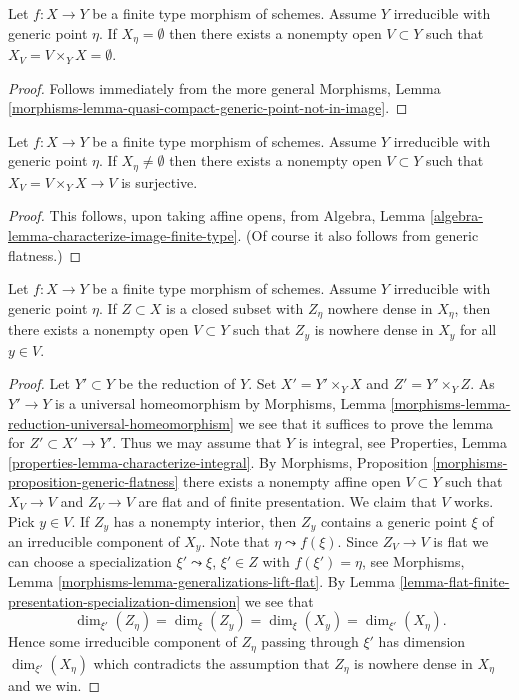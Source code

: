 \begin{lemma}
\label{lemma-empty-generic-fibre}
Let $f : X \to Y$ be a finite type morphism of schemes. Assume
$Y$ irreducible with generic point $\eta$. If $X_\eta = \emptyset$
then there exists a nonempty open $V \subset Y$ such that
$X_V = V \times_Y X = \emptyset$.
\end{lemma}

\begin{proof}
Follows immediately from the more general
Morphisms,
Lemma \ref{morphisms-lemma-quasi-compact-generic-point-not-in-image}.
\end{proof}

\begin{lemma}
\label{lemma-nonempty-generic-fibre}
Let $f : X \to Y$ be a finite type morphism of schemes. Assume
$Y$ irreducible with generic point $\eta$. If $X_\eta \not = \emptyset$
then there exists a nonempty open $V \subset Y$ such that
$X_V = V \times_Y X \to V$ is surjective.
\end{lemma}

\begin{proof}
This follows, upon taking affine opens, from
Algebra, Lemma \ref{algebra-lemma-characterize-image-finite-type}.
(Of course it also follows from generic flatness.)
\end{proof}

\begin{lemma}
\label{lemma-nowhere-dense-generic-fibre}
Let $f : X \to Y$ be a finite type morphism of schemes. Assume
$Y$ irreducible with generic point $\eta$.
If $Z \subset X$ is a closed subset with $Z_\eta$ nowhere dense
in $X_\eta$, then there exists a nonempty open $V \subset Y$ such
that $Z_y$ is nowhere dense in $X_y$ for all $y \in V$.
\end{lemma}

\begin{proof}
Let $Y' \subset Y$ be the reduction of $Y$.
Set $X' = Y' \times_Y X$ and $Z' = Y' \times_Y Z$.
As $Y' \to Y$ is a universal homeomorphism by
Morphisms, Lemma \ref{morphisms-lemma-reduction-universal-homeomorphism}
we see that it suffices to prove the lemma for $Z' \subset X' \to Y'$.
Thus we may assume that $Y$ is integral, see
Properties, Lemma \ref{properties-lemma-characterize-integral}.
By
Morphisms, Proposition \ref{morphisms-proposition-generic-flatness}
there exists a nonempty affine open $V \subset Y$ such that
$X_V \to V$ and $Z_V \to V$ are flat and of finite presentation.
We claim that $V$ works.
Pick $y \in V$. If $Z_y$ has a nonempty interior, then $Z_y$ contains
a generic point $\xi$ of an irreducible component of $X_y$.
Note that $\eta \leadsto f(\xi)$. Since $Z_V \to V$ is flat we can
choose a specialization $\xi' \leadsto \xi$, $\xi' \in Z$
with $f(\xi') = \eta$, see
Morphisms, Lemma \ref{morphisms-lemma-generalizations-lift-flat}.
By
Lemma \ref{lemma-flat-finite-presentation-specialization-dimension}
we see that
$$
\dim_{\xi'}(Z_\eta) = \dim_{\xi}(Z_y) = \dim_{\xi}(X_y) = \dim_{\xi'}(X_\eta).
$$
Hence some irreducible component of $Z_\eta$ passing through $\xi'$ has
dimension $\dim_{\xi'}(X_\eta)$ which contradicts the assumption that
$Z_\eta$ is nowhere dense in $X_\eta$ and we win.
\end{proof}

